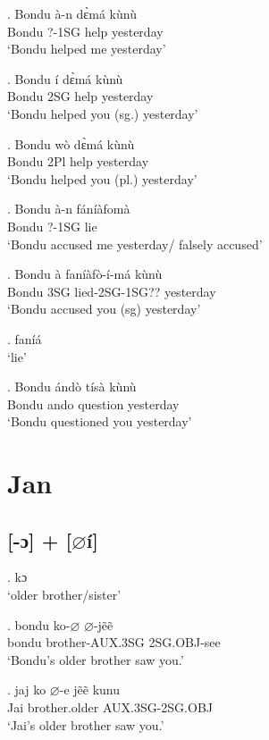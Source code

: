 \documentclass{assets/fieldnotes}
\begin{document}
\exg. Bondu à-n dɛ̀má kùnù\\
Bondu   ?-1SG  help   yesterday\\ 
`Bondu helped me yesterday'

\exg. Bondu í dɛ̀má kùnù\\
Bondu 2SG help yesterday\\
`Bondu helped you (sg.) yesterday'

\exg. Bondu wò dɛ̀má kùnù\\
Bondu 2Pl help yesterday\\
`Bondu helped you (pl.) yesterday' 

\exg. Bondu à-n fáníàfomà \\
Bondu ?-1SG lie \\
`Bondu accused me yesterday/ falsely accused'

\exg. Bondu à faníàfò-í-má kùnù\\
Bondu 3SG lied-2SG-1SG??  yesterday\\
`Bondu accused you (sg) yesterday'

\ex. faníá\\
`lie'
 

\ex. Bondu ándò tísà kùnù\\
Bondu ando question yesterday\\
`Bondu questioned you yesterday'


\section{Jan}

\subsection{[-ɔ] + [$\varnothing$í]}

\ex. kɔ \\
`older brother/sister'

\exg. bondu ko-$\varnothing$ $\varnothing$-jẽẽ  \\
bondu brother-AUX.3SG 2SG.OBJ-see \\
`Bondu's older brother saw you.'


\exg. jaj ko $\varnothing$-e jẽẽ kunu \\
Jai brother.older  AUX.3SG-2SG.OBJ \\
`Jai's older brother saw you.'

\end{document}
